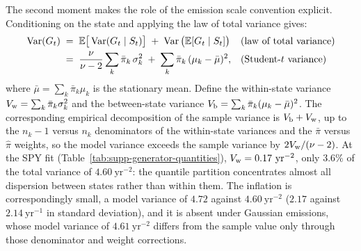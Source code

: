 The second moment makes the role of the emission scale convention
explicit. Conditioning on the state and applying the law of total
variance gives:
\begin{align}
  \operatorname{Var}(G_t)
   &\;=\; \mathbb{E}\big[\operatorname{Var}(G_t \mid S_t)\big]
     \;+\; \operatorname{Var}\big(\mathbb{E}[G_t \mid S_t]\big)
     && \text{(law of total variance)} \notag \\
   &\;=\; \frac{\nu}{\nu - 2} \sum_k \bar\pi_k\, \sigma_k^2
     \;+\; \sum_k \bar\pi_k\, (\mu_k - \bar\mu)^2,
     && \text{(Student-$t$ variance)}
  \label{eq:supp-variance}
\end{align}
where $\bar\mu = \sum_k \bar\pi_k \mu_k$ is the stationary mean.
Define the within-state variance $V_{\rm w} = \sum_k \bar\pi_k
\sigma_k^2$ and the between-state variance $V_{\rm b} = \sum_k
\bar\pi_k (\mu_k - \bar\mu)^2$. The corresponding empirical
decomposition of the sample variance is $V_{\rm b} + V_{\rm w}$, up to
the $n_k - 1$ versus $n_k$ denominators of the within-state variances
and the $\bar\pi$ versus $\hat\pi$ weights, so the model variance
exceeds the sample variance by $2 V_{\rm w} / (\nu - 2)$. At the SPY fit
(Table~\ref{tab:supp-generator-quantities}),
$V_{\rm w} = 0.17~\mathrm{yr}^{-2}$, only $3.6\%$ of the total
variance of $4.60~\mathrm{yr}^{-2}$: the quantile partition
concentrates almost all dispersion between states rather than within
them. The inflation is correspondingly small, a model variance of
$4.72$ against $4.60~\mathrm{yr}^{-2}$ ($2.17$ against
$2.14~\mathrm{yr}^{-1}$ in standard deviation), and it is absent under
Gaussian emissions, whose model variance of $4.61~\mathrm{yr}^{-2}$
differs from the sample value only through those denominator and
weight corrections.

